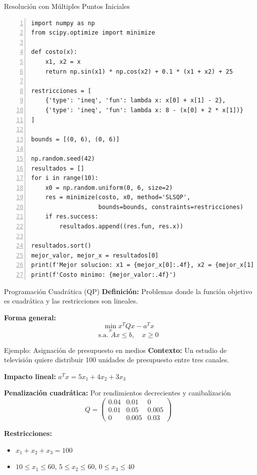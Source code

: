 \documentclass{beamer}
\begin{document}
\begin{frame}[fragile]{Resolución con Múltiples Puntos Iniciales}
    \begin{lstlisting}[numbers=left, numbersep=5pt]
import numpy as np
from scipy.optimize import minimize

def costo(x):
    x1, x2 = x
    return np.sin(x1) * np.cos(x2) + 0.1 * (x1 + x2) + 25

restricciones = [
    {'type': 'ineq', 'fun': lambda x: x[0] + x[1] - 2},
    {'type': 'ineq', 'fun': lambda x: 8 - (x[0] + 2 * x[1])}
]

bounds = [(0, 6), (0, 6)]

np.random.seed(42)
resultados = []
for i in range(10):
    x0 = np.random.uniform(0, 6, size=2)
    res = minimize(costo, x0, method='SLSQP', 
                   bounds=bounds, constraints=restricciones)
    if res.success:
        resultados.append((res.fun, res.x))

resultados.sort()
mejor_valor, mejor_x = resultados[0]
print(f'Mejor solucion: x1 = {mejor_x[0]:.4f}, x2 = {mejor_x[1]:.4f}')
print(f'Costo minimo: {mejor_valor:.4f}')
    \end{lstlisting}
\end{frame}

\begin{frame}{Programación Cuadrática (QP)}
    \textbf{Definición:} Problemas donde la función objetivo es cuadrática y las restricciones son lineales.
    
    \vspace{0.3cm}
    
    \textbf{Forma general:}
    \[\min_{x} x^T Q x - a^T x\]
    \[\text{s.a. } Ax \leq b, \quad x \geq 0\]
\end{frame}
    
\begin{frame}{Ejemplo: Asignación de presupuesto en medios}
    \textbf{Contexto:} Un estudio de televisión quiere distribuir 100 unidades de presupuesto entre tres canales.
    
    \vspace{0.3cm}
    
    \textbf{Impacto lineal:} $a^T x = 5x_1 + 4x_2 + 3x_3$
    
    \textbf{Penalización cuadrática:} Por rendimientos decrecientes y canibalización
        \[Q=\begin{pmatrix}
        0.04 & 0.01 & 0    \\
        0.01 & 0.05 & 0.005\\
        0    & 0.005& 0.03
        \end{pmatrix}\]
    
    \textbf{Restricciones:}
    \begin{itemize}
        \item $x_1 + x_2 + x_3 = 100$
        \item $10 \leq x_1 \leq 60$, $5 \leq x_2 \leq 60$, $0 \leq x_3 \leq 40$
    \end{itemize}
\end{frame}
\end{document}
